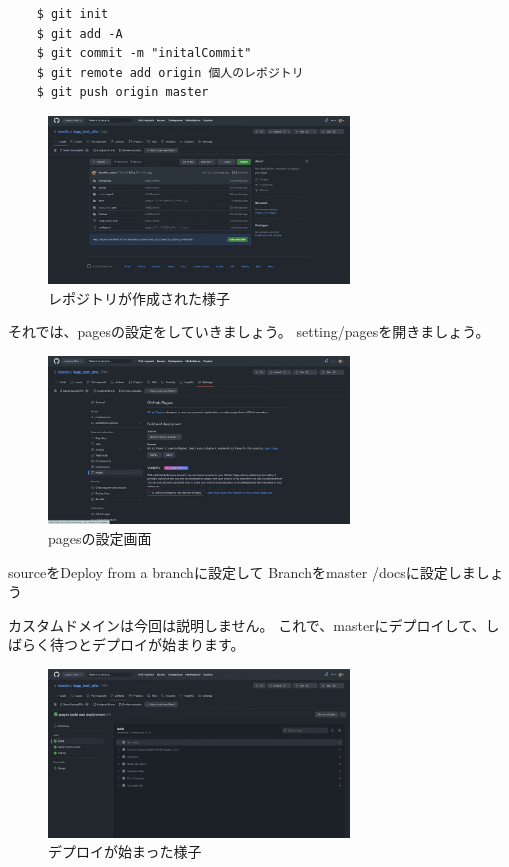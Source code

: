   \begin{shaded}
    \begin{verbatim}
    $ git init
    $ git add -A
    $ git commit -m "initalCommit"
    $ git remote add origin 個人のレポジトリ
    $ git push origin master
    \end{verbatim}
  \end{shaded}

  \begin{figure}[H]
    \centering
    \includegraphics[width=8cm]{./image/02-chap6/git1.png}
    \caption{レポジトリが作成された様子}
    \label{chap6-git1-image}
  \end{figure}

  それでは、pagesの設定をしていきましょう。
  setting/pagesを開きましょう。

  \begin{figure}[H]
    \centering
    \includegraphics[width=8cm]{./image/02-chap6/git2.png}
    \caption{pagesの設定画面}
    \label{chap6-pages1-image}
  \end{figure}

  sourceをDeploy from a branchに設定して
  Branchをmaster /docsに設定しましょう

  カスタムドメインは今回は説明しません。
  これで、masterにデプロイして、しばらく待つとデプロイが始まります。

  \begin{figure}[H]
    \centering
    \includegraphics[width=8cm]{./image/02-chap6/git4.png}
    \caption{デプロイが始まった様子}
    \label{chap6-pages2-image}
  \end{figure}

